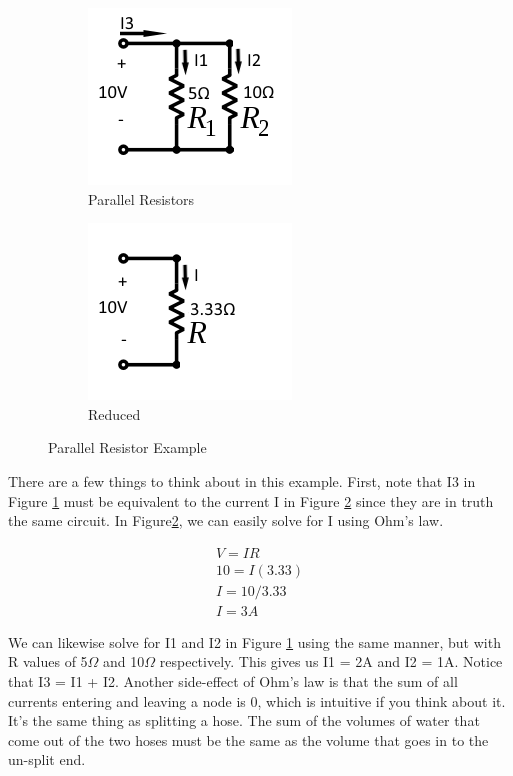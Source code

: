 \begin{figure}
\centering
\begin{subfigure}{.5\textwidth}
  \centering
  \includegraphics[scale=0.75]{parallelresistorsexample.png}
  \caption{Parallel Resistors}
  \label{fig:parallelresistorsexample}
\end{subfigure}%
\begin{subfigure}{.5\textwidth}
  \centering
  \includegraphics[scale=0.75]{parallelresistorsexamplemerged.png}
  \caption{Reduced}
  \label{fig:parallelresistorsexamplemerged}
  \end{subfigure}
\caption{Parallel Resistor Example}
\label{fig:resistorscombinations}
\end{figure}

There are a few things to think about in this example. First, note that I3 in Figure \ref{fig:parallelresistorsexample} must be equivalent to the current I in Figure \ref{fig:parallelresistorsexamplemerged} since they are in truth the same circuit. In Figure\ref{fig:parallelresistorsexamplemerged}, we can easily solve for I using Ohm's law.

\begin{equation} \label{eqn:solvefori}
\begin{split}
V = IR \\
10 = I(3.33)\\
I = 10/3.33 \\
I = 3A
\end{split}
\end{equation}


We can likewise solve for I1 and I2 in Figure \ref{fig:parallelresistorsexample} using the same manner, but with R values of 5$\Omega$ and 10$\Omega$ respectively. This gives us I1 = 2A and I2 = 1A. Notice that I3 = I1 + I2. Another side-effect of Ohm's law is that the sum of all currents entering and leaving a node is 0, which is intuitive if you think about it. It's the same thing as splitting a hose. The sum of the volumes of water that come out of the two hoses must be the same as the volume that goes in to the un-split end.


